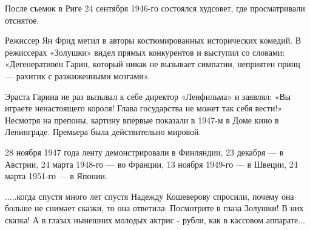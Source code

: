 После съемок в Риге 24 сентября 1946-го состоялся худсовет, где просматривали
отснятое.

Режиссер Ян Фрид метил в авторы костюмированных исторических комедий. В
режиссерах «Золушки» видел прямых конкурентов и выступил со словами:
«Дегенеративен Гарин, который никак не вызывает симпатии, неприятен принц —
рахитик с разжиженными мозгами».

Эраста Гарина не раз вызывал к себе директор «Ленфильма» и заявлял: «Вы играете
ненастоящего короля! Глава государства не может так себя вести!» Несмотря на
препоны, картину впервые показали в 1947-м в Доме кино в Ленинграде.  Премьера
была действительно мировой.

28 ноября 1947 года ленту демонстрировали в Финляндии, 23 декабря — в Австрии,
24 марта 1948-го — во Франции, 13 ноября 1949-го — в Швеции, 24 марта 1951-го —
в Японии.

.....когда спустя много лет спустя Надежду Кошеверову спросили, почему она больше не снимает сказки, то она ответила: Посмотрите в глаза Золушки! В них сказка! А в глазах нынешних молодых актрис - рубли, как в кассовом аппарате...

